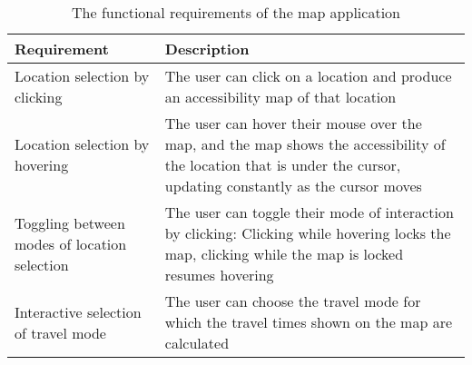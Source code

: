 \begin{table}[H]
	\caption{The functional requirements of the map application}
	\label{tab:functional requirements}
	\centering
	\begin{tabular}{ | L{0.3\textwidth} | L{0.6\textwidth} | }
		\hline
		Requirement
		& Description
		\\
		\hline
		\hline
		Location selection by clicking
		& The user can click on a location and produce an accessibility map of that location
		\\
		\hline
		Location selection by hovering
		& The user can hover their mouse over the map,
		and the map shows the accessibility of the location that is under the cursor,
		updating constantly as the cursor moves
		\\
		\hline
		Toggling between modes of location selection
		& The user can toggle their mode of interaction by clicking:
		Clicking while hovering locks the map, clicking while the map is locked resumes hovering
		\\
		\hline
		Interactive selection of travel mode
		& The user can choose the travel mode for which the travel times shown on the map are calculated
		\\
		\hline
	\end{tabular}
\end{table}
